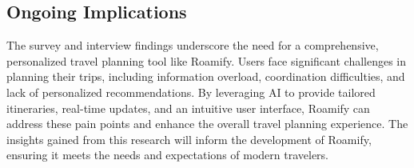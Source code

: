 \documentclass[conference]{IEEEtran}
\begin{document}
    \subsection{Ongoing Implications}
        The survey and interview findings underscore the need for a comprehensive, personalized travel planning tool like Roamify. Users face significant challenges in planning their trips, including information overload, coordination difficulties, and lack of personalized recommendations. By leveraging AI to provide tailored itineraries, real-time updates, and an intuitive user interface, Roamify can address these pain points and enhance the overall travel planning experience. The insights gained from this research will inform the development of Roamify, ensuring it meets the needs and expectations of modern travelers.


\newpage
\end{document}

